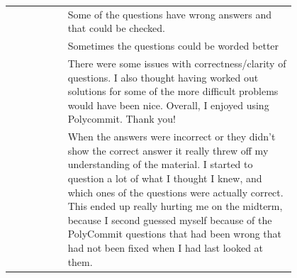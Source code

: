 \begin{longtable}{r|p{0.8\linewidth}}
		& Some of the questions have wrong answers and that could be checked.                                                                                                                                                                                                                                                                                                                                                                                                                                                                                                                                                                                                                                                                              \\
		& Sometimes the questions could be worded better                                                                                                                                                                                                                                                                                                                                                                                                                                                                                                                                                                                                                                                                                                   \\
		& There were some issues with correctness/clarity of questions. I also thought having worked out solutions for some of the more difficult problems would have been nice. Overall, I enjoyed using Polycommit. Thank you!                                                                                                                                                                                                                                                                                                                                                                                                                                                                                                                           \\
		& When the answers were incorrect or they didn't show the correct answer it really threw off my understanding of the material. I started to question a lot of what I thought I knew, and which ones of the questions were actually correct. This ended up really hurting me on the midterm, because I second guessed myself because of the PolyCommit questions that had been wrong that had not been fixed when I had last looked at them.                                                                                                                                                                                                                                                                                                        \\

\end{longtable}
